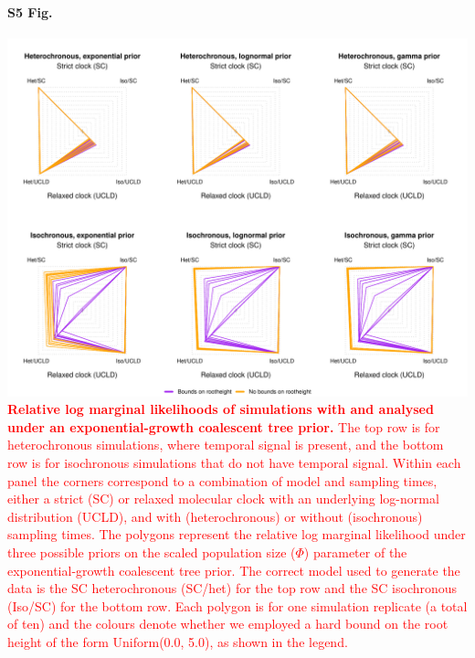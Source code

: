 \documentclass[10pt,letterpaper]{article}
\begin{document}
\paragraph*{S5 Fig.}
\label{S5_Fig}
	\begin{center}
		\includegraphics[width=14cm]{sandbox_figures/coalescent_exponential_sims.pdf}\newline
		\textcolor{red}{\textbf{Relative log marginal likelihoods of simulations with and analysed under an exponential-growth coalescent tree prior.} The top row is for heterochronous simulations, where temporal signal is present, and the bottom row is for isochronous simulations that do not have temporal signal. Within each panel the
		corners correspond to a combination of model and sampling times, either a strict (SC) or relaxed molecular clock with an underlying log-normal distribution (UCLD), and with (heterochronous) or without (isochronous) sampling times. The polygons represent the relative log marginal likelihood under three possible priors on the scaled population size ($\Phi$) parameter of the exponential-growth coalescent tree prior. The correct model used to generate the data is the SC heterochronous (SC/het) for the top row and the SC isochronous (Iso/SC) for the bottom row. Each polygon is for one simulation replicate (a total of ten) and the colours denote whether we employed a hard bound on the root height of the form Uniform(0.0, 5.0), as shown in the legend.}
	\end{center}
\end{document}
